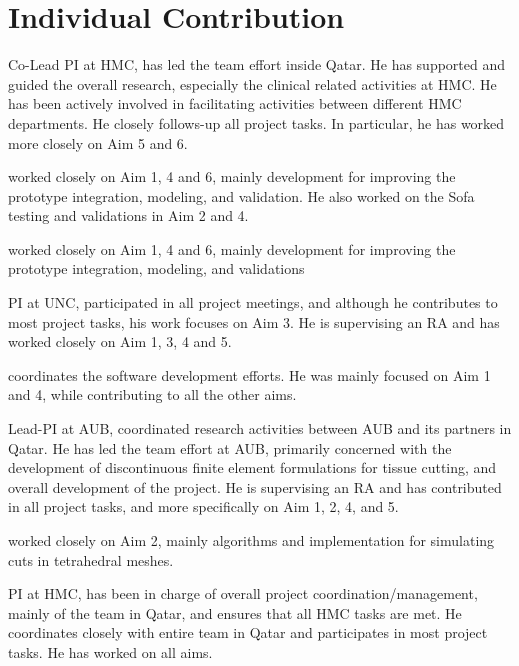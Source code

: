 \chapter{Individual Contribution}\label{apn:individual_contribution}
\begin{description}[itemsep=1em]
  \item [Abdulla AlAnsari] Co-Lead PI at HMC, has led the team effort inside Qatar. He has supported and guided the overall research, especially the clinical related activities at HMC. He has been actively involved in facilitating activities between different HMC departments. He closely follows-up all project tasks. In particular, he has worked more closely on Aim 5 and 6.
  \item [AbdulRahman AlFayad] worked closely on Aim 1, 4 and 6, mainly development for improving the prototype integration, modeling, and validation. He also worked on the Sofa testing and validations in Aim 2 and 4.
  \item [Ahammed Waseem Palliyali] worked closely on Aim 1, 4 and 6, mainly development for improving the prototype integration, modeling, and validations
  \item [Dinesh Manocha] PI at UNC, participated in all project meetings, and although he contributes to most project tasks, his work focuses on Aim 3. He is supervising an RA and has worked closely on Aim 1, 3, 4 and 5.
  \item [Georges Younes] coordinates the software development efforts. He was mainly focused on Aim 1 and 4, while contributing to all the other aims.
  \item [George Turkkiyyah] Lead-PI at AUB, coordinated research activities between AUB and its partners in Qatar. He has led the team effort at AUB, primarily concerned with the development of discontinuous finite element formulations for tissue cutting, and overall development of the project. He is supervising an RA and has contributed in all project tasks, and more specifically on Aim 1, 2, 4, and 5.
  \item [Gorune Ohannessian] worked closely on Aim 2, mainly algorithms and implementation for simulating cuts in tetrahedral meshes.
  \item [Hawa Hamza]
  \item [Jhasketan Phadan]
  \item [Julien AbiNahed] PI at HMC, has been in charge of overall project coordination/management, mainly of the team in Qatar, and ensures that all HMC tasks are met. He coordinates closely with entire team in Qatar and participates in most project tasks. He has worked on all aims.

\end{description}
